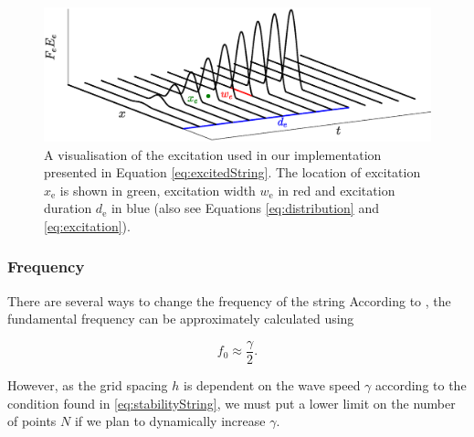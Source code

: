 \documentclass{article}
\begin{document}
\begin{figure}[t]
\centering
\includegraphics[width=1.0\columnwidth]{excitation.eps}
\caption{A visualisation of the excitation used in our implementation presented in Equation \eqref{eq:excitedString}. The location of excitation $x_\text{e}$ is shown in green, excitation width $w_\text{e}$ in red and excitation duration $d_\text{e}$ in blue (also see Equations \eqref{eq:distribution} and \eqref{eq:excitation}). \label{fig:exctiation}}
\end{figure}

\subsubsection{Frequency}
There are several ways to change the frequency of the string
According to \cite{Bilbao2009:NumericalSoundSynthesis},  the fundamental frequency can be approximately calculated using

\begin{equation}
    f_0 \approx \frac{\gamma}{2}.
\end{equation}

However, as the grid spacing $h$ is dependent on the wave speed $\gamma$ according to the condition found in \eqref{eq:stabilityString}, we must put a lower limit on the number of points $N$ if we plan to dynamically increase $\gamma$.
\end{document}
